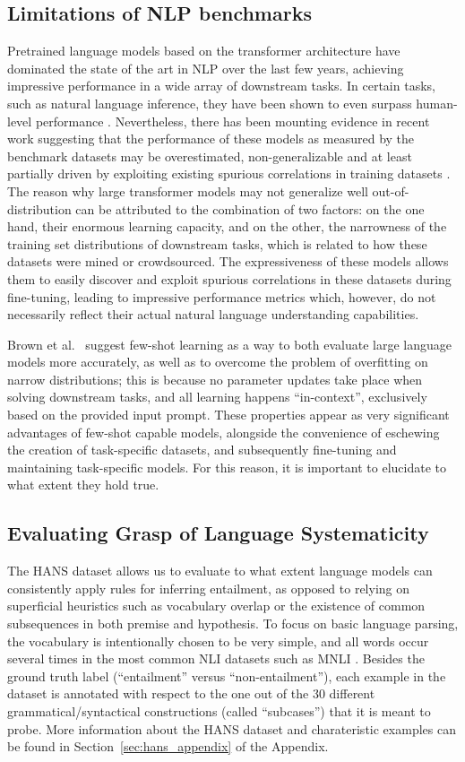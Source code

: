 \documentclass[11pt]{article}
\begin{document}
\subsection{Limitations of NLP benchmarks}
Pretrained language models based on the transformer architecture have dominated the state of the art in NLP over the last few years, achieving impressive performance in a wide array of downstream tasks. In certain tasks, such as natural language inference, they have been shown to even surpass human-level performance \cite{t5}. Nevertheless, there has been mounting evidence in recent work suggesting that the performance of these models as measured by the benchmark datasets may be overestimated, non-generalizable and at least partially driven by exploiting existing spurious correlations in training datasets \cite{gururanganSLSBS18,hendrycksLWDKS20, hans,nieWDBWK20,yogotama19}.
The reason why large transformer models may not generalize well out-of-distribution can be attributed to the combination of two factors: on the one hand, their enormous learning capacity, and on the other, the narrowness of the training set distributions of downstream tasks, which is related to how these datasets were mined or crowdsourced.
The expressiveness of these models allows them to easily discover and exploit spurious correlations in these datasets during fine-tuning, leading to impressive performance metrics which, however, do not necessarily reflect their actual natural language understanding capabilities.

Brown et al.\ \cite{brown2020language} suggest few-shot learning as a way to both evaluate large language models more accurately, as well as to overcome the problem of overfitting on narrow distributions; this is because no parameter updates take place when solving downstream tasks, and all learning happens ``in-context'', exclusively based on the provided input prompt. These properties appear as very significant advantages of few-shot capable models, alongside the convenience of eschewing the creation of task-specific datasets, and subsequently fine-tuning and maintaining task-specific models. For this reason, it is important to elucidate to what extent they hold true.

\subsection{Evaluating Grasp of Language Systematicity}
The HANS dataset \cite{hans} allows us to evaluate to what extent language models can consistently apply rules for inferring entailment, as opposed to relying on superficial heuristics such as vocabulary overlap or the existence of common subsequences in both premise and hypothesis. To focus on basic language parsing, the vocabulary is intentionally chosen to be very simple, and all words occur several times in the most common NLI datasets such as MNLI \cite{N18-1101}. Besides the ground truth label (``entailment'' versus ``non-entailment''), each example in the dataset is annotated with respect to the one out of the 30 different grammatical/syntactical constructions (called ``subcases'') that it is meant to probe. More information about the HANS dataset and charateristic examples can be found in Section~\ref{sec:hans_appendix} of the Appendix.
\end{document}

